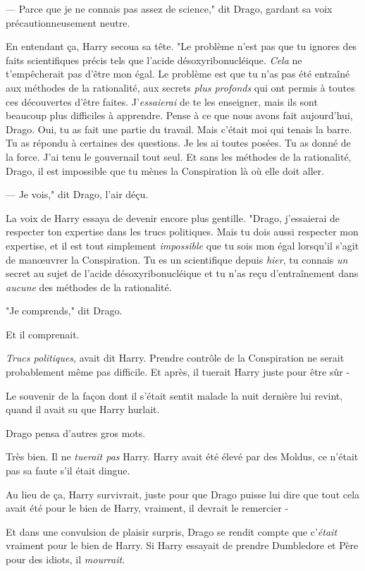 --- Parce que je ne connais pas assez de science," dit Drago, gardant sa voix précautionneusement neutre.

En entendant ça, Harry secoua sa tête. "Le problème n'est pas que tu ignores des faits scientifiques précis tels que l'acide désoxyribonucléique. \emph{Cela} ne t'empêcherait pas d'être mon égal. Le problème est que tu n'as pas été entraîné aux méthodes de la rationalité, aux secrets \emph{plus profonds} qui ont permis à toutes ces découvertes d'être faites. J'\emph{essaierai} de te les enseigner, mais ils sont beaucoup plus difficiles à apprendre. Pense à ce que nous avons fait aujourd'hui, Drago. Oui, tu as fait une partie du travail. Mais c'était moi qui tenais la barre. Tu as répondu à certaines des questions. Je les ai toutes posées. Tu as donné de la force. J'ai tenu le gouvernail tout seul. Et sans les méthodes de la rationalité, Drago, il est impossible que tu mènes la Conspiration là où elle doit aller.

--- Je vois," dit Drago, l'air déçu.

La voix de Harry essaya de devenir encore plus gentille. "Drago, j'essaierai de respecter ton expertise dans les trucs politiques. Mais tu dois aussi respecter mon expertise, et il est tout simplement \emph{impossible} que tu sois mon égal lorsqu'il s'agit de manœuvrer la Conspiration. Tu es un scientifique depuis \emph{hier}, tu connais \emph{un} secret au sujet de l'acide désoxyribonucléique et tu n'as reçu d'entraînement dans \emph{aucune} des méthodes de la rationalité.

"Je comprends," dit Drago.

Et il comprenait.

\emph{Trucs politiques}, avait dit Harry. Prendre contrôle de la Conspiration ne serait probablement même pas difficile. Et après, il tuerait Harry juste pour être sûr -

Le souvenir de la façon dont il s'était sentit malade la nuit dernière lui revint, quand il avait su que Harry hurlait.

Drago pensa d'autres gros mots.

Très bien. Il ne \emph{tuerait pas} Harry. Harry avait été élevé par des Moldus, ce n'était pas sa faute s'il était dingue.

Au lieu de ça, Harry survivrait, juste pour que Drago puisse lui dire que tout cela avait été pour le bien de Harry, vraiment, il devrait le remercier -

Et dans une convulsion de plaisir surpris, Drago se rendit compte que c'\emph{était} vraiment pour le bien de Harry. Si Harry essayait de prendre Dumbledore et Père pour des idiots, il \emph{mourrait}.

